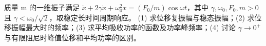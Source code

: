 质量 m 的一维振子满足 \(\ddot x+2\gamma\dot x+\omega_0^2x=(F_0/m)\cos\omega t\)，其中 \(\gamma,\omega_0,F_0,m>0\) 且 \(\gamma<\omega_0/\sqrt2\)，取稳定长时间周期响应。
(1) 求位移复振幅与稳态振幅；(2) 求位移振幅最大时的频率；(3) 求平均吸收功率的函数及功率峰频率；(4) 讨论 \(\gamma\to0^+\) 与有限阻尼时峰值位移和平均功率的区别。
